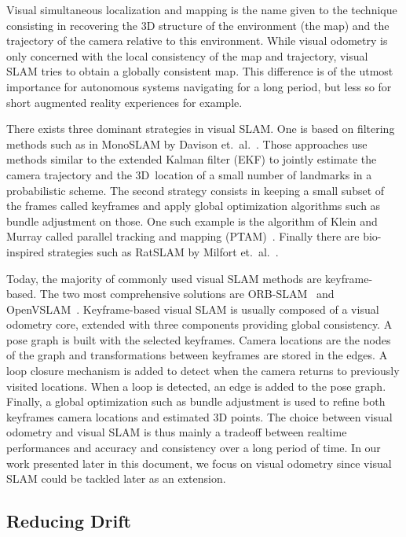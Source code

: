 Visual simultaneous localization and mapping is the name given to the technique
consisting in recovering the 3D structure of the environment (the map)
and the trajectory of the camera relative to this environment.
While visual odometry is only concerned with the local consistency of the
map and trajectory, visual SLAM tries to obtain a globally consistent map.
This difference is of the utmost importance for autonomous systems navigating
for a long period, but less so for short augmented reality experiences for example.

There exists three dominant strategies in visual SLAM.
One is based on filtering methods
such as in MonoSLAM by Davison et.\ al.~\cite{davison2007monoslam}.
Those approaches use methods similar to the extended Kalman filter (EKF)
to jointly estimate the camera trajectory and the 3D location
of a small number of landmarks in a probabilistic scheme.
The second strategy consists in keeping a small subset of the frames
called keyframes and apply global optimization algorithms such as
bundle adjustment on those.
One such example is the algorithm of Klein and Murray called
parallel tracking and mapping (PTAM)~\cite{klein2007parallel}.
Finally there are bio-inspired strategies such as RatSLAM
by Milfort et.\ al.~\cite{milford2004ratslam}.

Today, the majority of commonly used visual SLAM methods are keyframe-based.
The two most comprehensive solutions are ORB-SLAM~\cite{mur2015orb}
and OpenVSLAM~\cite{sumikura2019openvslam}.
Keyframe-based visual SLAM is usually composed of a visual odometry core,
extended with three components providing global consistency.
A pose graph is built with the selected keyframes.
Camera locations are the nodes of the graph and transformations
between keyframes are stored in the edges.
A loop closure mechanism is added to detect when the camera
returns to previously visited locations.
When a loop is detected, an edge is added to the pose graph.
Finally, a global optimization such as bundle adjustment
is used to refine both keyframes camera locations
and estimated 3D points.
The choice between visual odometry and visual SLAM
is thus mainly a tradeoff between realtime performances
and accuracy and consistency over a long period of time.
In our work presented later in this document, we focus on visual odometry since
visual SLAM could be tackled later as an extension.

\subsection{Reducing Drift}%
\label{sub:reducing-drift}

